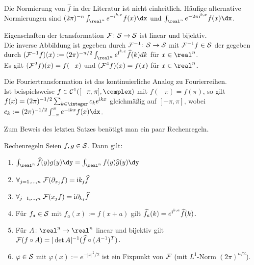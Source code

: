 \begin{Bem}
    Die Normierung von $\widehat{f}$ in der Literatur ist nicht einheitlich.
    Häufige alternative Normierungen sind
    $(2\pi)^{-n} \int_{\real^n} e^{-\iu\sp{k,x}} f(x)\dx$ und
    $\int_{\real^n} e^{-2\pi\iu\sp{k,x}} f(x)\dx$.
\end{Bem}

\begin{Satz}{Eigenschaften der transformation}
    $\F\colon \S \rightarrow \S$ ist linear und bijektiv.\\
    Die inverse Abbildung ist gegeben durch $\F^{-1}\colon \S \rightarrow \S$ mit
    $\F^{-1} f \in \S$ der  gegeben durch
    $(\F^{-1} f)(x) := (2\pi)^{-n/2} \int_{\real^n} e^{\iu\sp{k,x}} \widehat{f}(k)dk$
    für $x \in \real^n$.\\
    Es gilt $(\F^2 f)(x) = f(-x)$ und $(\F^4 f)(x) = f(x)$ für $x \in \real^n$.
\end{Satz}

\begin{Bem}
    Die Fouriertransformation ist das kontinuierliche Analog zu Fourierreihen.\\
    Ist beispielsweise $f \in \C^1([-\pi,\pi], \complex)$ mit $f(-\pi) = f(\pi)$,
    so gilt $f(x) = (2\pi)^{-1/2} \sum_{k \in \integer} c_k e^{\iu kx}$ gleichmäßig auf
    $[-\pi, \pi]$, wobei $c_k := (2\pi)^{-1/2} \int_{-\pi}^\pi e^{-\iu kx} f(x)\dx$.
\end{Bem}

\linie

\begin{Bem}
    Zum Beweis des letzten Satzes benötigt man ein paar Rechenregeln.
\end{Bem}

\begin{Satz}{Rechenregeln}
    Seien $f, g \in \S$.
    Dann gilt:
    \begin{enumerate}
        \item
        $\int_{\real^n} \widehat{f}(y)g(y)\dy = \int_{\real^n} f(y)\widehat{g}(y)\dy$
        
        \item
        $\forall_{j=1,\dotsc,n}\;
        \F(\partial_{x_j} f) = \iu k_j \widehat{f}$
        
        \item
        $\forall_{j=1,\dotsc,n}\;
        \F(x_j f) = \iu \partial_{k_j} \widehat{f}$
        
        \item
        Für $f_a \in \S$ mit $f_a(x) := f(x + a)$ gilt
        $\widehat{f_a}(k) = e^{\iu\sp{k,a}} \widehat{f}(k)$.
        
        \item
        Für $A\colon \real^n \rightarrow \real^n$ linear und bijektiv gilt
        $\F(f \circ A) = |\det A|^{-1} (\widehat{f} \circ (A^{-1})^T)$.
        
        \item
        $\varphi \in \S$ mit $\varphi(x) := e^{-|x|^2/2}$ ist ein Fixpunkt von $\F$
        (mit $L^1$-Norm $(2\pi)^{n/2}$).
    \end{enumerate}
\end{Satz}

